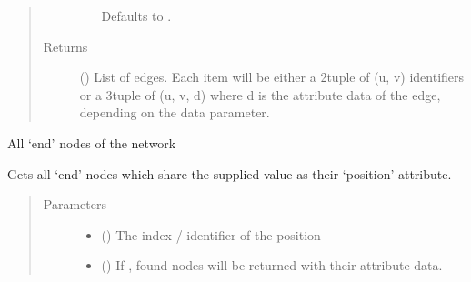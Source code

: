\documentclass[letterpaper,10pt,english]{sphinxmanual}
\begin{document}
\begin{fulllineitems}
\begin{fulllineitems}
\begin{quote}
\begin{description}
\begin{itemize}
Defaults to .


\end{itemize}

\item[{Returns}] \leavevmode
{} () \textendash{} List of edges. Each item will be either a 2\sphinxhyphen{}tuple of (u, v)
identifiers or a 3\sphinxhyphen{}tuple of (u, v, d) where d is the attribute data
of the edge, depending on the data parameter.

\end{description}\end{quote}

\end{fulllineitems}


\begin{fulllineitems}
\label{\detokenize{cockatoo:cockatoo.KnitNetworkBase.end_nodes}}
All ‘end’ nodes of the network

\end{fulllineitems}


\begin{fulllineitems}
\label{\detokenize{cockatoo:cockatoo.KnitNetworkBase.ends_on_position}}
Gets all ‘end’ nodes which share the supplied value as their ‘position’
attribute.
\begin{quote}\begin{description}
\item[{Parameters}] \leavevmode\begin{itemize}
\item {} 
 () \textendash{} The index / identifier of the position

\item {} 
 (\sphinxstyleliteralemphasis{\sphinxupquote{, }}) \textendash{} 
If , found nodes will be returned with their attribute
data.


\end{itemize}
\end{description}
\end{quote}
\end{fulllineitems}
\end{fulllineitems}
\end{document}
